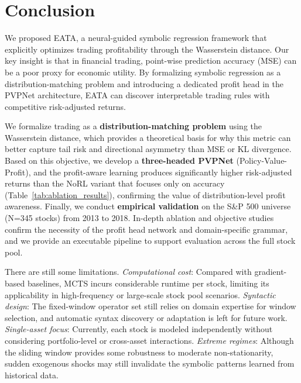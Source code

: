 \section{Conclusion}
\label{sec:conclusion}

We proposed EATA, a neural-guided symbolic regression framework that explicitly optimizes trading profitability through the Wasserstein distance. Our key insight is that in financial trading, point-wise prediction accuracy (MSE) can be a poor proxy for economic utility. By formalizing symbolic regression as a distribution-matching problem and introducing a dedicated profit head in the PVPNet architecture, EATA can discover interpretable trading rules with competitive risk-adjusted returns.

We formalize trading as a \textbf{distribution-matching problem} using the Wasserstein distance, which provides a theoretical basis for why this metric can better capture tail risk and directional asymmetry than MSE or KL divergence. Based on this objective, we develop a \textbf{three-headed PVPNet} (Policy-Value-Profit), and the profit-aware learning produces significantly higher risk-adjusted returns than the NoRL variant that focuses only on accuracy (Table~\ref{tab:ablation_results}), confirming the value of distribution-level profit awareness. Finally, we conduct \textbf{empirical validation} on the S\&P 500 universe (N=345 stocks) from 2013 to 2018. In-depth ablation and objective studies confirm the necessity of the profit head network and domain-specific grammar, and we provide an executable pipeline to support evaluation across the full stock pool.

There are still some limitations. \textit{Computational cost}: Compared with gradient-based baselines, MCTS incurs considerable runtime per stock, limiting its applicability in high-frequency or large-scale stock pool scenarios. \textit{Syntactic design}: The fixed-window operator set still relies on domain expertise for window selection, and automatic syntax discovery or adaptation is left for future work. \textit{Single-asset focus}: Currently, each stock is modeled independently without considering portfolio-level or cross-asset interactions. \textit{Extreme regimes}: Although the sliding window provides some robustness to moderate non-stationarity, sudden exogenous shocks may still invalidate the symbolic patterns learned from historical data.

